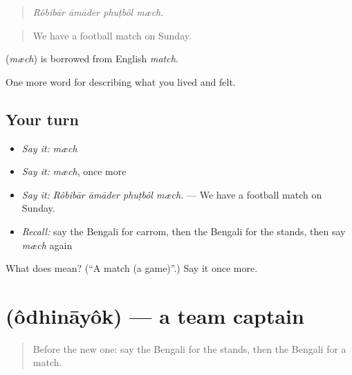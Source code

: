 \begin{quote}
   
\end{quote}

\begin{quote}
\emph{Rôbibār āmāder phuṭbôl mæch.}
\end{quote}

\begin{quote}
We have a football match on Sunday.
\end{quote}

\begin{cousinweb}
\textbf{} (\emph{mæch}) is borrowed from English \emph{match}.
\end{cousinweb}

\begin{grammarlens}[title={What you've built}]
One more word for describing what you lived and felt.
\end{grammarlens}

\subsection*{Your turn}
\begin{itemize}
\raggedright
  \item \emph{Say it:} \emph{mæch}
  \item \emph{Say it:} \emph{mæch}, once more
  \item \emph{Say it:} \emph{Rôbibār āmāder phuṭbôl mæch.} — We have a football match on Sunday.
  \item \emph{Recall:} say the Bengali for carrom, then the Bengali for the stands, then say \emph{mæch} again
\end{itemize}

\begin{tcolorbox}[breakable,colback=teal!4,colframe=teal!35!black,title={Before you move on}]
What does  mean? (\textquotedblleft{}A match (a game)\textquotedblright{}.) Say it once more.
\end{tcolorbox}
\section[\texorpdfstring{\bn{অধিনায়ক} (ôdhināyôk)}{অধিনায়ক (ôdhināyôk)}]{ (ôdhināyôk) — a team captain}

\label{lesson:BN-C519-odhinayok}



\begin{quote}
Before the new one: say the Bengali for the stands, then the Bengali for a match.
\end{quote}

